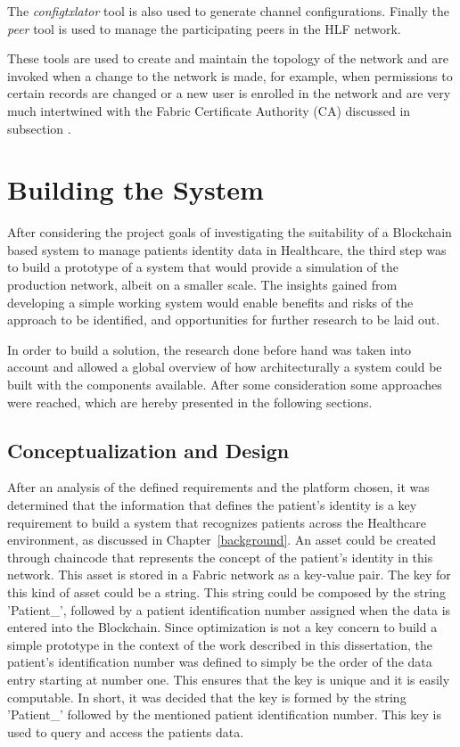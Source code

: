 The \textit{configtxlator} tool is also used to generate channel
configurations.  Finally the \textit{peer} tool is used to manage the
participating peers in the HLF network.

These tools are used to create and maintain the topology of the network and are
invoked when a change to the network is made, for example, when permissions to
certain records are changed or a new user is enrolled in the network and are
very much intertwined with the Fabric Certificate Authority (CA) discussed in
subsection .

\section{Building the System}

After considering the project goals of investigating the suitability of a
Blockchain based system to manage patients identity data in Healthcare, the
third step was to build a prototype of a system that would provide a simulation
of the production network, albeit on a smaller scale. The insights gained from
developing a simple working system would enable benefits and risks of the
approach to be identified, and opportunities for further research to be laid
out.

In order to build a solution, the research done before hand was taken into
account and allowed a global overview of how architecturally a system could be
built with the components available. After some consideration some approaches
were reached, which are hereby presented in the following sections.

\subsection{Conceptualization and Design}

After an analysis of the defined requirements and the platform chosen, it was
determined that the information that defines the patient's identity is a key
requirement to build a system that recognizes patients across the Healthcare
environment, as discussed in Chapter~\ref{background}. An asset could be
created through chaincode that represents the concept of the patient's identity
in this network. This asset is stored in a Fabric network as a key-value pair.
The key for this kind of asset could be a string. This string could be composed
by the string 'Patient\_', followed by a patient identification number assigned
when the data is entered into the Blockchain. Since optimization is not a key
concern to build a simple prototype in the context of the work described in
this dissertation, the patient's identification number was defined to simply be
the order of the data entry starting at number one. This ensures that the key
is unique and it is easily computable. In short, it was decided that the key is
formed by the string 'Patient\_' followed by the mentioned patient
identification number. This key is used to query and access the patients data.

